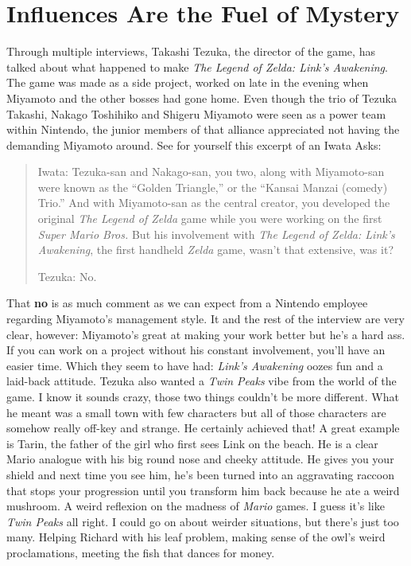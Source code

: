 \documentclass{book}
\begin{document}
\FloatBarrier\needspace{10mm}\section*{Influences Are the Fuel of Mystery}\nopagebreak[4]

Through multiple interviews, Takashi Tezuka, the director of the game, has talked about what happened to make \emph{The Legend of Zelda: Link’s Awakening}. The game was made as a side project, worked on late in the evening when Miyamoto and the other bosses had gone home. Even though the trio of Tezuka Takashi, Nakago Toshihiko and Shigeru Miyamoto were seen as a power team within Nintendo, the junior members of that alliance appreciated not having the demanding Miyamoto around. See for yourself this excerpt of an Iwata Asks:

\begin{quote}
Iwata: Tezuka-san and Nakago-san, you two, along with Miyamoto-san were known as the “Golden Triangle,” or the “Kansai Manzai (comedy) Trio.” And with Miyamoto-san as the central creator, you developed the original \emph{The Legend of Zelda} game while you were working on the first \emph{Super Mario Bros.} But his involvement with \emph{The Legend of Zelda: Link’s Awakening}, the first handheld \emph{Zelda} game, wasn’t that extensive, was it?

Tezuka: No.
\end{quote} \par

That \textbf{no} is as much comment as we can expect from a Nintendo employee regarding Miyamoto’s management style. It and the rest of the interview are very clear, however: Miyamoto’s great at making your work better but he’s a hard ass. If you can work on a project without his constant involvement, you’ll have an easier time. Which they seem to have had: \emph{Link’s Awakening} oozes fun and a laid-back attitude. Tezuka also wanted a \emph{Twin Peaks} vibe from the world of the game. I know it sounds crazy, those two things couldn’t be more different. What he meant was a small town with few characters but all of those characters are somehow really off-key and strange. He certainly achieved that! A great example is Tarin, the father of the girl who first sees Link on the beach. He is a clear Mario analogue with his big round nose and cheeky attitude. He gives you your shield and next time you see him, he’s been turned into an aggravating raccoon that stops your progression until you transform him back because he ate a weird mushroom. A weird reflexion on the madness of \emph{Mario} games. I guess it’s like \emph{Twin Peaks} all right. I could go on about weirder situations, but there’s just too many. Helping Richard with his leaf problem, making sense of the owl’s weird proclamations, meeting the fish that dances for money.
\end{document}
